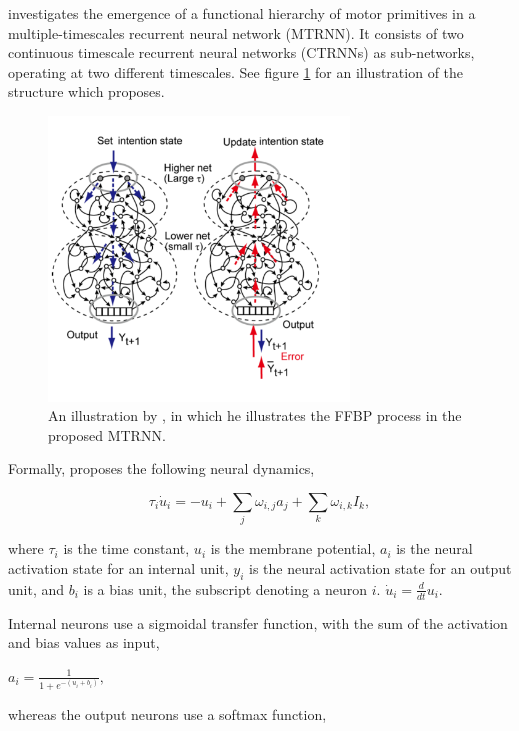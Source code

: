 \cite{Tani2014} investigates the emergence of a functional hierarchy of motor primitives in a multiple-timescales recurrent neural network (MTRNN). It consists of two continuous timescale recurrent neural networks (CTRNNs) as sub-networks, operating at two different timescales. See figure \ref{fig:tani_2014_mtrnn} for an illustration of the structure which \cite{Tani2014} proposes.

\begin{figure}
\centering
\includegraphics[width=8cm]{fig/tani_2014_mtrnn}
\caption{An illustration by \cite{Tani2014}, in which he illustrates the FFBP process in the proposed MTRNN.}
\label{fig:tani_2014_mtrnn}
\end{figure}

Formally, \cite{Tani2014} proposes the following neural dynamics,

\begin{equation}\label{tani_membrane_potential}
    \tau_i\dot{u}_i = -u_i + \sum_{j}{}\omega_{i,j}a_j + \sum_{k}{}\omega_{i,k} I_k,
\end{equation}

where $\tau_i$ is the time constant, $u_i$ is the membrane potential, $a_i$ is the neural activation state for an internal unit, $y_i$ is the neural activation state for an output unit, and $b_i$ is a bias unit, the subscript denoting a neuron $i$. $\dot{u}_i = \frac{d}{d t}u_i$.

Internal neurons use a sigmoidal transfer function, with the sum of the activation and bias values as input, 

\begin{center}\begin{math}
    a_i = \frac{1}{1+e^{-(u_i+b_i)}},
\end{math}\end{center}
whereas the output neurons use a softmax function,

